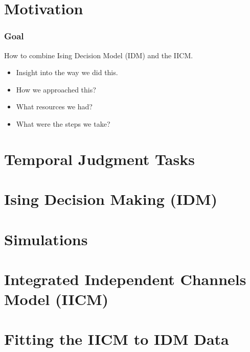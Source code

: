 \documentclass[xcolor={fixpdftex,hyperref,x11names},10pt,pdftex,hyperref={pdftex}]{beamer}
\begin{document}
\section{Motivation}
\label{sec:motivation}

\begin{frame}
  \frametitle{Goal}
  How to combine Ising Decision Model (IDM) and the IICM.

  \begin{itemize}
      \item Insight into the way we did this.
      \item How we approached this?
      \item What resources we had?
      \item What were the steps we take?
  \end{itemize}
\end{frame}

\section{Temporal Judgment Tasks}
\label{sec:tjt}





\section{Ising Decision Making (IDM)}
\label{sec:idm}





\section{Simulations}
\label{sec:simu}




\section{Integrated Independent Channels Model (IICM)}
\label{sec:iicm}





\section{Fitting the IICM to IDM Data}
\label{sec:fitting}
\end{document}
